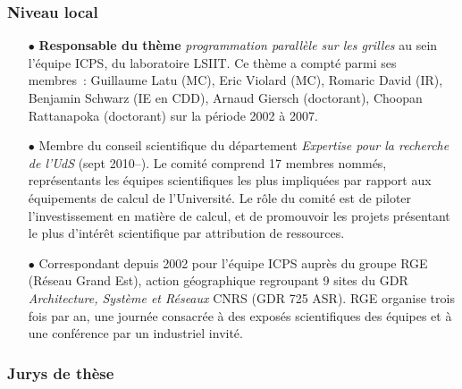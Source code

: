 \documentclass[11pt]{article}
\begin{document}

\subsubsection{Niveau local}
\begin{itemize}


\item[$\bullet$]
\textbf{Responsable du thème} \emph{programmation parallèle sur les grilles} au sein l'équipe ICPS,
du laboratoire LSIIT. Ce thème a compté parmi ses membres~: Guillaume Latu (MC), 
Eric Violard (MC), Romaric David (IR), Benjamin Schwarz (IE en CDD), Arnaud Giersch (doctorant), 
Choopan Rattanapoka (doctorant) sur la période 2002 à 2007.\\

\item [$\bullet$]
Membre du conseil scientifique du département \emph{Expertise pour la recherche de l'UdS} (sept 2010--).
Le comité comprend 17 membres nommés, représentants les équipes scientifiques les plus impliquées
par rapport aux équipements de calcul de l'Université. Le rôle du comité est de piloter
l'investissement en matière de calcul, et de promouvoir les projets présentant le plus
d'intérêt scientifique par attribution de ressources.\\

\item[$\bullet$]
Correspondant depuis 2002 pour l'équipe ICPS auprès du groupe RGE (Réseau Grand Est),
action géographique regroupant 9 sites du GDR \textit{Architecture, Système et Réseaux} 
CNRS (GDR 725 ASR). RGE organise trois fois par an, une journée consacrée à des exposés 
scientifiques des équipes et à une conférence par un industriel invité.\\


\end{itemize}

\subsubsection{Jurys de thèse}
\end{document}
